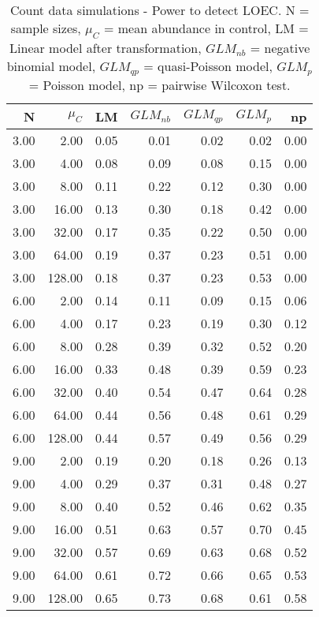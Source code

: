\begin{table}
\centering
\caption[Count data simulations - Power to detect LOEC.]{Count data simulations - Power to detect LOEC. N = sample sizes, 
             $\mu_C$ = mean abundance in control, LM = Linear model after transformation, 
             $GLM_{nb}$ = negative binomial model, $GLM_{qp}$ = quasi-Poisson model, 
            $GLM_{p}$ = Poisson model, np = pairwise Wilcoxon test.} 
\label{tab:pow_loec_c}
{\footnotesize
\begin{tabular}{rrrrrrr}
  \hline
N & $\mu_C$ & LM & $GLM_{nb}$ & $GLM_{qp}$ & $GLM_{p}$ & np \\ 
  \hline
3.00 & 2.00 & 0.05 & 0.01 & 0.02 & 0.02 & 0.00 \\ 
  3.00 & 4.00 & 0.08 & 0.09 & 0.08 & 0.15 & 0.00 \\ 
  3.00 & 8.00 & 0.11 & 0.22 & 0.12 & 0.30 & 0.00 \\ 
  3.00 & 16.00 & 0.13 & 0.30 & 0.18 & 0.42 & 0.00 \\ 
  3.00 & 32.00 & 0.17 & 0.35 & 0.22 & 0.50 & 0.00 \\ 
  3.00 & 64.00 & 0.19 & 0.37 & 0.23 & 0.51 & 0.00 \\ 
  3.00 & 128.00 & 0.18 & 0.37 & 0.23 & 0.53 & 0.00 \\ 
  6.00 & 2.00 & 0.14 & 0.11 & 0.09 & 0.15 & 0.06 \\ 
  6.00 & 4.00 & 0.17 & 0.23 & 0.19 & 0.30 & 0.12 \\ 
  6.00 & 8.00 & 0.28 & 0.39 & 0.32 & 0.52 & 0.20 \\ 
  6.00 & 16.00 & 0.33 & 0.48 & 0.39 & 0.59 & 0.23 \\ 
  6.00 & 32.00 & 0.40 & 0.54 & 0.47 & 0.64 & 0.28 \\ 
  6.00 & 64.00 & 0.44 & 0.56 & 0.48 & 0.61 & 0.29 \\ 
  6.00 & 128.00 & 0.44 & 0.57 & 0.49 & 0.56 & 0.29 \\ 
  9.00 & 2.00 & 0.19 & 0.20 & 0.18 & 0.26 & 0.13 \\ 
  9.00 & 4.00 & 0.29 & 0.37 & 0.31 & 0.48 & 0.27 \\ 
  9.00 & 8.00 & 0.40 & 0.52 & 0.46 & 0.62 & 0.35 \\ 
  9.00 & 16.00 & 0.51 & 0.63 & 0.57 & 0.70 & 0.45 \\ 
  9.00 & 32.00 & 0.57 & 0.69 & 0.63 & 0.68 & 0.52 \\ 
  9.00 & 64.00 & 0.61 & 0.72 & 0.66 & 0.65 & 0.53 \\ 
  9.00 & 128.00 & 0.65 & 0.73 & 0.68 & 0.61 & 0.58 \\ 
   \hline
\end{tabular}
}
\end{table}
